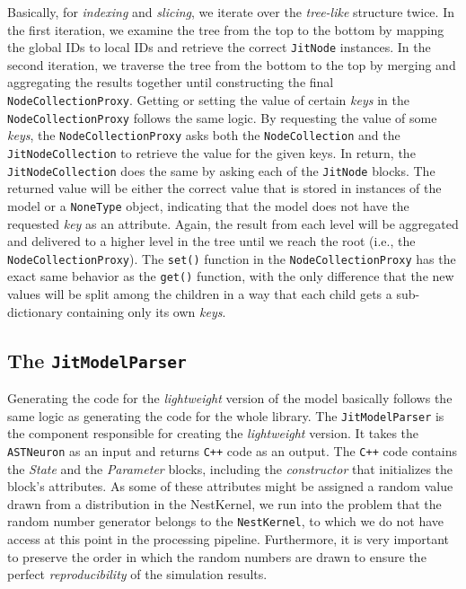 Basically, for \emph{indexing} and \emph{slicing}, we iterate over the \emph{tree-like} structure twice. In the first iteration, we examine the tree from the top to the bottom by mapping the global IDs to local IDs and retrieve the correct \texttt{JitNode} instances. In the second iteration, we traverse the tree from the bottom to the top by merging and aggregating the results together until constructing the final \texttt{NodeCollectionProxy}. Getting or setting the value of certain \emph{keys} in the \texttt{NodeCollectionProxy} follows the same logic. By requesting the value of some \emph{keys}, the \texttt{NodeCollectionProxy} asks both the \texttt{NodeCollection} and the \texttt{JitNodeCollection} to retrieve the value for the given keys. In return, the \texttt{JitNodeCollection} does the same by asking each of the \texttt{JitNode} blocks. The returned value will be either the correct value that is stored in instances of the model or a \texttt{NoneType} object, indicating that the model does not have the requested \emph{key} as an attribute. Again, the result from each level will be aggregated and delivered to a higher level in the tree until we reach the root (i.e., the \texttt{NodeCollectionProxy}). The \texttt{set()} function in the \texttt{NodeCollectionProxy} has the exact same behavior as the \texttt{get()} function, with the only difference that the new values will be split among the children in a way that each child gets a sub-dictionary containing only its own \emph{keys}.

\subsection{The \texttt{JitModelParser}}

Generating the code for the \emph{lightweight} version of the model basically follows the same logic as generating the code for the whole library. The \texttt{JitModelParser} is the component responsible for creating the \emph{lightweight} version. It takes the \texttt{ASTNeuron} as an input and returns \texttt{C++} code as an output. The \texttt{C++} code contains the \emph{State} and the \emph{Parameter} blocks, including the \emph{constructor} that initializes the block's attributes. As some of these attributes might be assigned a random value drawn from a distribution in the NestKernel, we run into the problem that the random number generator belongs to the \texttt{NestKernel}, to which we do not have access at this point in the processing pipeline. Furthermore, it is very important to preserve the order in which the random numbers are drawn to ensure the perfect \emph{reproducibility} of the simulation results.

